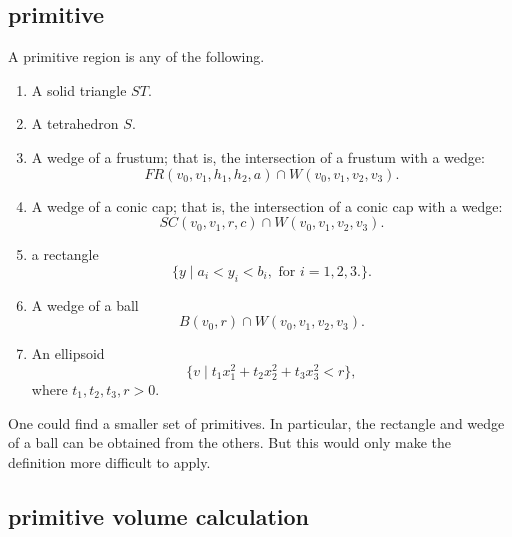 \subsection{primitive}

\begin{definition}[primitive]\label{def:primitive} 
A primitive region is any of the following.

\begin{enumerate}%
 \item A solid triangle $ST$.
 \item A tetrahedron $S$.
 \item A wedge of a frustum;
that is, the intersection of a frustum with
 a wedge:
    $$
     FR(v_0,v_1,h_1,h_2,a) \cap W(v_0,v_1,v_2,v_3).
    $$
\item A wedge of a conic cap; that is, the intersection of a conic cap
with
    a wedge:
    $$
    SC(v_0,v_1,r,c) \cap W(v_0,v_1,v_2,v_3).
    $$
\item a rectangle
    $$
    \{y \mid a_i < y_i < b_i,\text { for } i=1,2,3.\}.
    $$
\item A wedge of a ball
  $$
  B(v_0,r) \cap W(v_0,v_1,v_2,v_3).
  $$
\item An ellipsoid
   $$
   \{v \mid t_1 x_1^2 + t_2 x_2^2 + t_3 x_3^2 < r\},
   $$
where $t_1,t_2,t_3,r>0$.
\end{enumerate}
One could find a smaller set of primitives.  In particular, the
rectangle and wedge of a ball can be obtained from the others.  But
this would only make the definition more difficult to apply.

\end{definition}

\subsection{primitive volume calculation}\label{sec:primitive}

